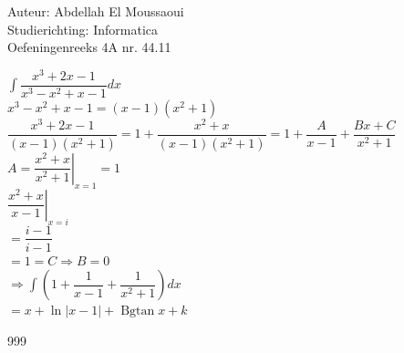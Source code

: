 \documentclass[a4paper]{article}
\begin{document}
  
\noindent \large Auteur: Abdellah El Moussaoui \\
\noindent \large Studierichting: Informatica\\
\noindent \large Oefeningenreeks 4A nr. 44.11\\

\medskip

\normalsize

$\displaystyle\int \dfrac{x^3+2x-1}{x^3-x^2+x-1}dx$\\

$x^3-x^2+x-1 = \left(x-1\right)\left(x^2+1\right)$\\

$\dfrac{x^3+2x-1}{\left(x-1\right)\left(x^2+1\right)} = 1 + \dfrac{x^2+x}{(x-1)(x^2+1)}=1+ \dfrac{A}{x-1} + \dfrac{Bx+C}{x^2+1}$\\


$A = \left.\dfrac{x^2+x}{x^2+1}\right|_{x = 1} = 1$\\

$\left.\dfrac{x^2+x}{x-1}\right|_{x = i}$\\

$ = \dfrac{i-1}{i-1}$\\

$ = 1 = C \Rightarrow B=0$ \\



$\Rightarrow \displaystyle\int \left(1+\dfrac{1}{x-1} + \dfrac{1}{x^2+1}\right)dx$\\


$ =  x+\ln{\left|x-1\right|} +\operatorname{Bgtan}x+k$\\

\begin{thebibliography}{999}
\end{thebibliography}
\end{document}

